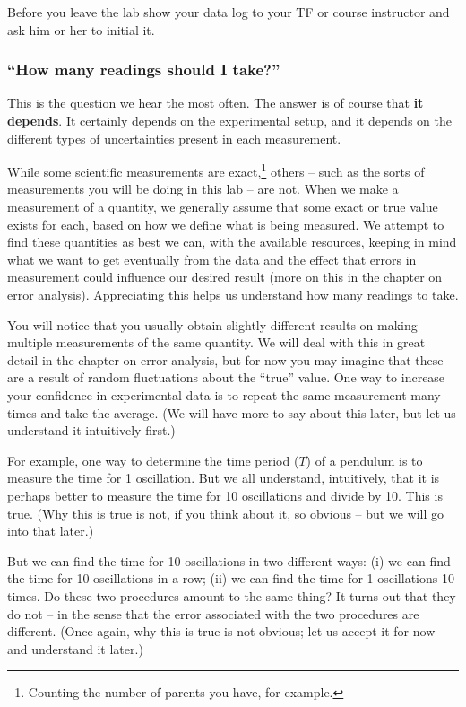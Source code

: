 Before you leave the lab show your data log to your TF or course instructor and ask him or her to initial it. 

\subsubsection{``How many readings should I take?''}

This is the question we hear the most often. The answer is of course that \textbf{it depends}. It certainly depends on the experimental setup, and it depends on the different types of uncertainties present in each measurement.

While some scientific measurements are exact,\footnote{Counting the number of parents you have, for example.} others -- such as the sorts of measurements you will be doing in this lab -- are not. When we make a measurement of a quantity, we generally assume that some exact or true value exists for each, based on how we define what is being measured. We attempt to find these quantities as best we can, with the available resources, keeping in mind what we want to get eventually from the data and the effect that errors in measurement could influence our desired result (more on this in the chapter on error analysis). Appreciating this helps us understand how many readings to take. 

You will notice that you usually obtain slightly different results on making multiple measurements of the same quantity. We will deal with this in great detail in the chapter on error analysis, but for now you may imagine that these are a result of random fluctuations about the ``true'' value. One way to increase your confidence in experimental data is to repeat the same measurement many times and take the average. (We will have more to say about this later, but let us understand it intuitively first.)

For example, one way to determine the time period ($T$) of a pendulum is to measure the time for 1 oscillation. But we all understand, intuitively, that it is perhaps better to measure the time for 10 oscillations and divide by 10.  This is true. (Why this is true is not, if you think about it, so obvious -- but we will go into that later.)

But we can find the time for 10 oscillations in two different ways: (i) we can find the time for 10 oscillations in a row; (ii) we can find the time for 1 oscillations 10 times. Do these two procedures amount to the same thing? It turns out that they do not -- in the sense that the error associated with the two procedures are different. (Once again, why this is true is not obvious; let us accept it for now and understand it later.) 

